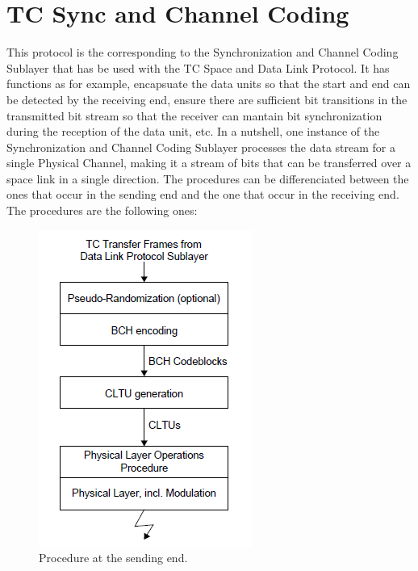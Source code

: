 \documentclass[12pt,a4paper]{report}
\begin{document}
\section{TC Sync and Channel Coding}
This protocol is the corresponding to the Synchronization and Channel Coding Sublayer that has be used with the TC Space and Data Link Protocol. It has functions as for example, encapsuate the data units so that the start and end can be detected by the receiving end, ensure there are sufficient bit transitions in the transmitted bit stream so that the receiver can mantain bit synchronization during the reception of the data unit, etc. In a nutshell, one instance of the Synchronization and Channel Coding Sublayer processes the data stream for a single Physical Channel, making it a stream of bits that can be transferred over a space link in a single direction. The procedures can be differenciated between the ones that occur in the sending end and the one that occur in the receiving end. The procedures are the following ones: 
\begin{figure}[H]
\begin{center}
\includegraphics[scale=1]{Proceduressendingend.PNG}    
\caption{Procedure at the sending end.}
\end{center}
\end{figure}
\end{document}
